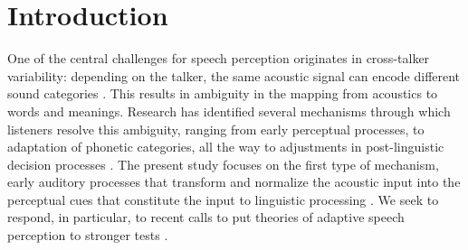 \documentclass[preprint]{JASA}
\begin{document}

\maketitle




\setcounter{secnumdepth}{5}
\setcounter{page}{1}
\setcounter{section}{0}

\section{Introduction}\label{sec:intro}

One of the central challenges for speech perception originates in cross-talker variability: depending on the talker, the same acoustic signal can encode different sound categories \citep{allen2003, liberman1967, newman2001}. This results in ambiguity in the mapping from acoustics to words and meanings. Research has identified several mechanisms through which listeners resolve this ambiguity, ranging from early perceptual processes, to adaptation of phonetic categories, all the way to adjustments in post-linguistic decision processes \citep[for review, see][]{xie2023}. The present study focuses on the first type of mechanism, early auditory processes that transform and normalize the acoustic input into the perceptual cues that constitute the input to linguistic processing \citep[for reviews,][]{barreda2020, johnson-sjerps2021, mcmurray-jongman2011, stilp2020, weatherholtz-jaeger2016}. We seek to respond, in particular, to recent calls to put theories of adaptive speech perception to stronger tests \citep{baeseberk2018, schertz-clare2020, xie2023}.
\end{document}
